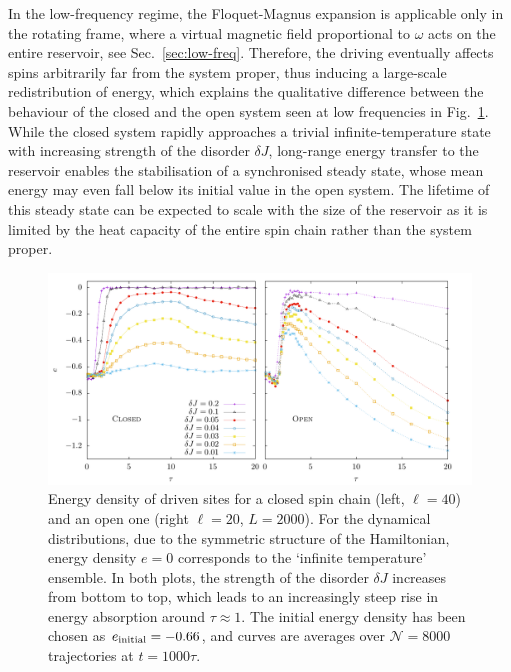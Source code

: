 \documentclass[aps,pre,twocolumn,notitlepage,floats,10pt]{revtex4-1}
\begin{document}
In the low-frequency regime, the Floquet-Magnus expansion is applicable only in
the rotating frame, where a virtual magnetic field proportional to $\omega$
acts on the entire reservoir, see Sec.~\ref{sec:low-freq}.
Therefore, the driving eventually affects spins arbitrarily far from the system
proper, thus inducing a large-scale redistribution of energy, which explains
the qualitative difference between the behaviour of the closed and the open
system seen at low frequencies in Fig.~\ref{fig:heating}.
While the closed system rapidly approaches a trivial infinite-temperature state
with increasing strength of the disorder $\delta J$, long-range energy transfer
to the reservoir enables the stabilisation of a synchronised steady state,
whose mean energy may even fall below its initial value in the open system.
The lifetime of this steady state can be expected to scale with the size of the
reservoir as it is limited by the heat capacity of the entire spin chain rather
than the system proper.

\begin{figure}[!ht]
  \includegraphics[width=0.95\linewidth]{figs/fig-5-heating-dj.pdf}
  \caption{
    Energy density of driven sites for a closed spin chain (left, $\ell=40$) and an
    open one (right $\ell=20$, $L=2000$).
    For the dynamical distributions, due to the symmetric structure of the
    Hamiltonian, energy density $e=0$ corresponds to the `infinite temperature'
    ensemble.
    In both plots, the strength of the disorder $\delta J$ increases from bottom to
    top, which leads to an increasingly steep rise in energy absorption around
    $\tau\approx 1$.
    The initial energy density has been chosen as $e_{\rm initial}=-0.66$, and
    curves are averages over $\mathcal{N}=8000$ trajectories at $t=1000\tau$.
  } \label{fig:heating}
\end{figure}
\end{document}
